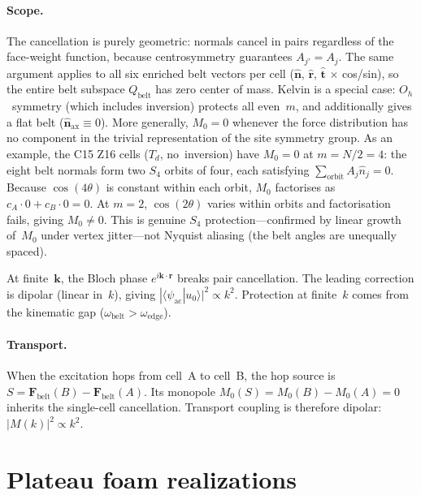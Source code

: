 \documentclass[12pt]{article}
\newcommand{\vk}{\bm{k}}
\newcommand{\vvr}{\bm{r}}
\newcommand{\vn}{\hat{\bm{n}}}
\newcommand{\vF}{\bm{F}}
\newcommand{\oedge}{\omega_{\mathrm{edge}}}
\newcommand{\obelt}{\omega_{\mathrm{belt}}}
\begin{document}
\paragraph{Scope.}
The cancellation is purely geometric: normals cancel in pairs
regardless of the face-weight function, because centrosymmetry
guarantees $A_{j'} = A_j$.  The same argument applies to all six
enriched belt vectors per cell ($\vn$, $\hat{\vvr}$, $\hat{\bm{t}}$
$\times$ cos/sin), so the entire belt subspace $Q_{\mathrm{belt}}$ has
zero center of mass.  Kelvin is a special case: $O_h$~symmetry (which includes inversion)
protects all even~$m$, and additionally gives a flat belt
($\vn_{\mathrm{ax}} \equiv 0$).  More generally, $M_0 = 0$ whenever the
force distribution has no component in the trivial representation of
the site symmetry group.  As an example, the C15 Z16 cells ($T_d$,
no~inversion) have $M_0 = 0$ at $m = N/2 = 4$: the eight belt normals
form two $S_4$ orbits of four, each satisfying
$\sum_{\mathrm{orbit}} A_j \hat{n}_j = 0$.  Because $\cos(4\theta)$
is constant within each orbit, $M_0$ factorises as
$c_A \cdot 0 + c_B \cdot 0 = 0$.  At $m = 2$, $\cos(2\theta)$
varies within orbits and factorisation fails, giving $M_0 \neq 0$.
This is genuine $S_4$ protection---confirmed by linear growth
of~$M_0$ under vertex jitter---not Nyquist aliasing (the belt angles
are unequally spaced).

At finite~$\vk$, the Bloch phase $e^{i\vk \cdot \vvr}$ breaks pair
cancellation.  The leading correction is dipolar (linear in~$k$),
giving $|\langle \psi_{\mathrm{ac}} | u_0 \rangle|^2 \propto k^2$.
Protection at finite~$k$ comes from the kinematic gap
($\obelt > \oedge$).

\paragraph{Transport.}
When the excitation hops from cell~A to cell~B, the hop source is
$S = \vF_{\mathrm{belt}}(B) - \vF_{\mathrm{belt}}(A)$.  Its monopole
$M_0(S) = M_0(B) - M_0(A) = 0$ inherits the single-cell cancellation.
Transport coupling is therefore dipolar: $|M(k)|^2 \propto k^2$.

\section{Plateau foam realizations}
\label{sec:foams}
\end{document}

